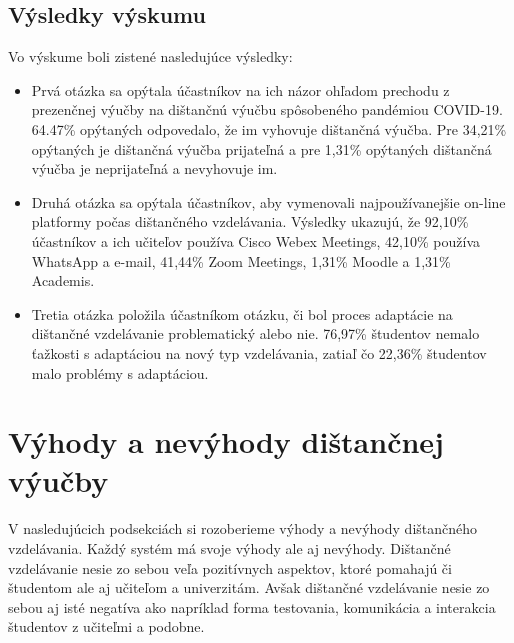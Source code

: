 \documentclass[10pt,oneside,slovak,a4paper]{article}
\begin{document}
\subsection{Výsledky výskumu}%
Vo výskume boli zistené nasledujúce výsledky\cite{covid19}: %
\begin{itemize}
	
	\item Prvá otázka sa opýtala účastníkov na ich názor ohľadom prechodu z prezenčnej výučby na dištančnú výučbu spôsobeného pandémiou COVID-19. 64.47\% opýtaných odpovedalo, že im vyhovuje dištančná výučba. Pre 34,21\% opýtaných je dištančná výučba prijateľná a pre 1,31\% opýtaných dištančná výučba je neprijateľná a nevyhovuje im.
	\item Druhá otázka sa opýtala účastníkov, aby vymenovali najpoužívanejšie on-line platformy počas dištančného vzdelávania. Výsledky ukazujú, že 92,10\% účastníkov a ich učiteľov používa Cisco Webex Meetings, 42,10\% používa WhatsApp a e-mail, 41,44\% Zoom Meetings, 1,31\% Moodle a 1,31\% Academis.
	\item Tretia otázka položila účastníkom otázku, či bol proces adaptácie na dištančné vzdelávanie problematický alebo nie. 76,97\% študentov nemalo ťažkosti s adaptáciou na nový typ vzdelávania, zatiaľ čo 22,36\% študentov malo problémy s adaptáciou.
\end{itemize}

\section{Výhody a nevýhody dištančnej výučby}
V nasledujúcich podsekciách si rozoberieme výhody a nevýhody dištančného vzdelávania\cite{Sokolova2018}. Každý systém má svoje výhody ale aj nevýhody. Dištančné vzdelávanie nesie zo sebou veľa pozitívnych aspektov, ktoré pomahajú či študentom ale aj učiteľom a univerzitám. Avšak dištančné vzdelávanie nesie zo sebou aj isté negatíva ako napríklad forma testovania, komunikácia a interakcia študentov z učiteľmi a podobne. 
\end{document}
